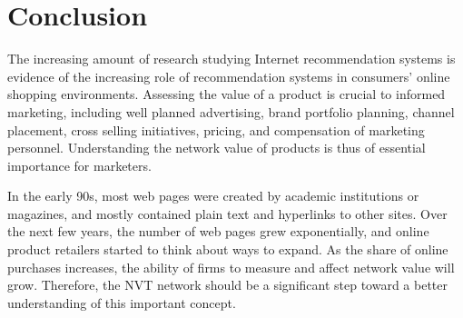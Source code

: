 
\chapter{Conclusion} %

\label{Chapter5} %

The increasing amount of research studying Internet recommendation systems is evidence of the increasing role of recommendation systems in consumers’ online shopping environments. Assessing the value of a product is crucial to informed marketing, including well planned advertising, brand portfolio planning, channel placement, cross selling initiatives, pricing, and compensation of marketing personnel. Understanding the network value of products is thus of essential importance for marketers.

In the early 90s, most web pages were created by academic institutions or magazines, and mostly contained plain text and hyperlinks to other sites. Over the next few years, the number of web pages grew exponentially, and online product retailers started to think about ways to expand. As the share of online purchases increases, the ability of firms to measure and affect network value will grow. Therefore, the NVT network should be a significant step toward a better understanding of this important concept.